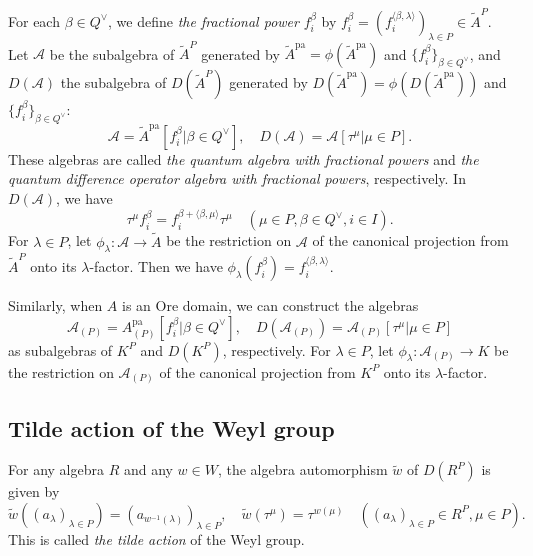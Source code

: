 \documentclass[12pt,twoside]{article}
\newcommand\bra{\langle}
\newcommand\ket{\rangle}
\newcommand\A{{\mathcal A}}
\newcommand\Qv{Q^\vee}
\newcommand\tw{{\widetilde w}}
\newcommand\tA{{\widetilde A}}
\newcommand\pa{{\mathrm{pa}}}
\theoremstyle{plain} %
\theoremstyle{definition} %
\theoremstyle{definition} %
\numberwithin{theorem}{section}
\numberwithin{equation}{section}
\numberwithin{figure}{section}
\numberwithin{table}{section}
\begin{document}
For each $\beta\in\Qv$, we define 
{\em the fractional power} $f_i^\beta$ by \(
 f_i^\beta=(f_i^{\bra\beta,\lambda\ket})_{\lambda\in P} \in\tA^P
\). Let $\A$ be the subalgebra of $\tA^P$ generated 
by $\tA^\pa=\phi(\tA^\pa)$ and $\{f_i^\beta\}_{\beta\in\Qv}$,
and $D(\A)$ the subalgebra of $D(\tA^P)$ generated
by $D(\tA^\pa)=\phi(D(\tA^\pa))$ and $\{f_i^\beta\}_{\beta\in\Qv}$:
\begin{equation*}
 \A    = \tA^\pa[f_i^\beta|\beta\in\Qv], \quad
 D(\A) = \A[\tau^\mu|\mu\in P].
\end{equation*}
These algebras are called {\em the quantum algebra with fractional powers}
and {\em the quantum difference operator algebra with fractional powers}, 
respectively. In $D(\A)$, we have
\begin{equation*}
 \tau^\mu f_i^\beta = f_i^{\beta+\bra\beta,\mu\ket}\tau^\mu
 \quad (\mu\in P, \beta\in\Qv, i\in I).
\end{equation*}
For $\lambda\in P$, let $\phi_\lambda:\A\to\tA$ be the restriction on $\A$ of 
the canonical projection from $\tA^P$ onto its $\lambda$-factor.
Then we have $\phi_\lambda(f_i^\beta)=f_i^{\bra\beta,\lambda\ket}$.

Similarly, when $A$ is an Ore domain, we can construct the algebras
\begin{equation*}
 \A_{(P)}    = A^\pa_{(P)}[f_i^\beta|\beta\in\Qv], \quad
 D(\A_{(P)}) = \A_{(P)}[\tau^\mu|\mu\in P]
\end{equation*}
as subalgebras of $K^P$ and $D(K^P)$, respectively.
For $\lambda\in P$, let $\phi_\lambda:\A_{(P)}\to K$ be 
the restriction on $\A_{(P)}$ of 
the canonical projection from $K^P$ onto its $\lambda$-factor.


\subsection{Tilde action of the Weyl group}
\label{sec:tilde}

For any algebra $R$ and any $w\in W$, 
the algebra automorphism $\tw$ of $D(R^P)$ is given by
\begin{equation*}
 \tw((a_\lambda)_{\lambda\in P}) = (a_{w^{-1}(\lambda)})_{\lambda\in P},
 \quad
 \tw(\tau^\mu) = \tau^{w(\mu)}
 \quad 
 ((a_\lambda)_{\lambda\in P}\in R^P, \mu\in P).
\end{equation*}
This is called {\em the tilde action} of the Weyl group.
\end{document}

